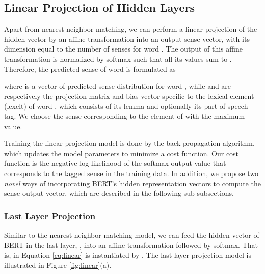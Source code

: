 \documentclass[11pt,a4paper]{article}
\begin{document}
\subsection{Linear Projection of Hidden Layers}
\label{sec:incorporating_linear}

\begin{figure*}
\caption{\label{fig:linear} Illustration of WSD models by linear projection of (a) the last layer and (b) the weighted sum of all layers.}
\end{figure*}

Apart from nearest neighbor matching, we can perform a linear projection of the hidden vector  by an affine transformation into an output sense vector, with its dimension equal to the number of senses for word . The output of this affine transformation is normalized by softmax such that all its values sum to . Therefore, the predicted sense  of word  is formulated as

where  is a vector of predicted sense distribution for word , while  and  are respectively the projection matrix and bias vector specific to the lexical element (lexelt) of word , which consists of its lemma and optionally its part-of-speech tag. We choose the sense corresponding to the element of  with the maximum value.

Training the linear projection model is done by the back-propagation algorithm, which updates the model parameters to minimize a cost function. Our cost function is the negative log-likelihood of the softmax output value that corresponds to the tagged sense in the training data. In addition, we propose two {\it novel} ways of incorporating BERT's hidden representation vectors to compute the sense output vector, which are described in the following sub-subsections.

\subsubsection{Last Layer Projection}
\label{sec:incorporating_linear_last}

Similar to the nearest neighbor matching model, we can feed the hidden vector of BERT in the last layer, , into an affine transformation followed by softmax. That is,  in Equation \ref{eq:linear} is instantiated by . The last layer projection model is illustrated in Figure \ref{fig:linear}(a).
\end{document}
